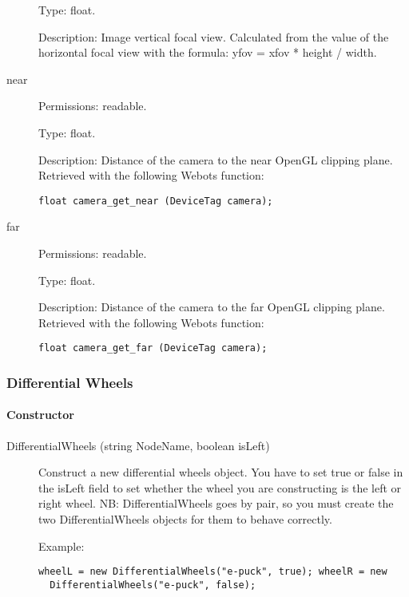 \begin{description}
  Type: float.


  Description: Image vertical focal view. Calculated from the value of
  the horizontal focal view with the formula: yfov = xfov * height /
  width.

\item[{near}] Permissions: readable.


  Type: float.


  Description: Distance of the camera to the near OpenGL clipping
  plane.  Retrieved with the following Webots function:


\begin{lstlisting}[firstnumber=1,]
  float camera_get_near (DeviceTag camera);
\end{lstlisting}
\item[{far}] Permissions: readable.


  Type: float.


  Description: Distance of the camera to the far OpenGL clipping
  plane.  Retrieved with the following Webots function:


\begin{lstlisting}[firstnumber=1,]
  float camera_get_far (DeviceTag camera);
\end{lstlisting}
\end{description}

\subsubsection{Differential Wheels}
\label{webots.uobjects.robotdevices.differentialwheels}%

\paragraph{Constructor}
\label{webots.uobjects.robotdevices.differentialwheels.constructor}%

\noindent
\begin{description}
\item[{DifferentialWheels (string NodeName, boolean isLeft)}]
  Construct a new differential wheels object. You have to set true or
  false in the isLeft field to set whether the wheel you are
  constructing is the left or right wheel.  NB: DifferentialWheels
  goes by pair, so you must create the two DifferentialWheels objects
  for them to behave correctly.

  Example:

\begin{lstlisting}[firstnumber=1,]
  wheelL = new DifferentialWheels("e-puck", true); wheelR = new
  DifferentialWheels("e-puck", false);
\end{lstlisting}
\end{description}

